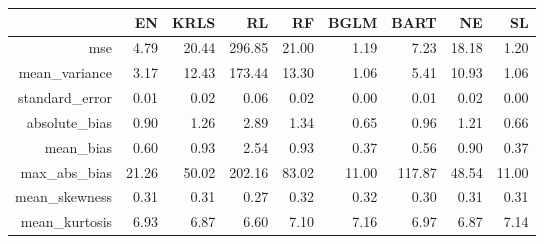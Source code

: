 \begin{table}[ht]
\centering
\begin{tabular}{rrrrrrrrr}
  \hline
 & EN & KRLS & RL & RF & BGLM & BART & NE & SL \\ 
  \hline
mse & 4.79 & 20.44 & 296.85 & 21.00 & 1.19 & 7.23 & 18.18 & 1.20 \\ 
  mean\_variance & 3.17 & 12.43 & 173.44 & 13.30 & 1.06 & 5.41 & 10.93 & 1.06 \\ 
  standard\_error & 0.01 & 0.02 & 0.06 & 0.02 & 0.00 & 0.01 & 0.02 & 0.00 \\ 
  absolute\_bias & 0.90 & 1.26 & 2.89 & 1.34 & 0.65 & 0.96 & 1.21 & 0.66 \\ 
  mean\_bias & 0.60 & 0.93 & 2.54 & 0.93 & 0.37 & 0.56 & 0.90 & 0.37 \\ 
  max\_abs\_bias & 21.26 & 50.02 & 202.16 & 83.02 & 11.00 & 117.87 & 48.54 & 11.00 \\ 
  mean\_skewness & 0.31 & 0.31 & 0.27 & 0.32 & 0.32 & 0.30 & 0.31 & 0.31 \\ 
  mean\_kurtosis & 6.93 & 6.87 & 6.60 & 7.10 & 7.16 & 6.97 & 6.87 & 7.14 \\ 
   \hline
\end{tabular}
\end{table}
